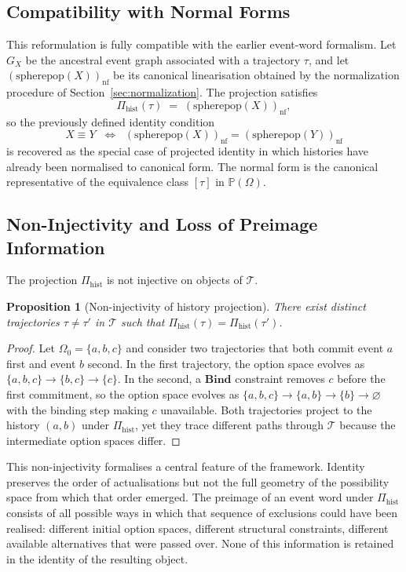 \documentclass[12pt]{article}
\theoremstyle{plain}
\newtheorem{proposition}[theorem]{Proposition}
\theoremstyle{definition}
\theoremstyle{remark}
\newcommand{\Bind}{\mathbf{Bind}}
\newcommand{\PathCat}{\mathbb{P}(\Omega)}
\begin{document}
\subsection{Compatibility with Normal Forms}

This reformulation is fully compatible with the earlier event-word formalism.
Let $G_X$ be the ancestral event graph associated with a trajectory $\tau$, and
let $(\mathrm{spherepop}(X))_{\mathrm{nf}}$ be its canonical linearisation
obtained by the normalization procedure of Section~\ref{sec:normalization}.
The projection satisfies
\[
  \Pi_{\mathrm{hist}}(\tau) \;=\; (\mathrm{spherepop}(X))_{\mathrm{nf}},
\]
so the previously defined identity condition
\[
  X \equiv Y
  \;\;\Longleftrightarrow\;\;
  (\mathrm{spherepop}(X))_{\mathrm{nf}} = (\mathrm{spherepop}(Y))_{\mathrm{nf}}
\]
is recovered as the special case of projected identity in which histories have
already been normalised to canonical form.  The normal form is the canonical
representative of the equivalence class $[\tau]$ in $\PathCat$.

\subsection{Non-Injectivity and Loss of Preimage Information}

The projection $\Pi_{\mathrm{hist}}$ is not injective on objects of
$\mathcal{T}$.

\begin{proposition}[Non-injectivity of history projection]
\label{prop:noninjectivity}
There exist distinct trajectories $\tau \neq \tau'$ in $\mathcal{T}$ such that
$\Pi_{\mathrm{hist}}(\tau) = \Pi_{\mathrm{hist}}(\tau')$.
\end{proposition}

\begin{proof}
Let $\Omega_0 = \{a, b, c\}$ and consider two trajectories that both commit
event $a$ first and event $b$ second.  In the first trajectory, the option space
evolves as $\{a,b,c\} \to \{b,c\} \to \{c\}$.  In the second, a $\Bind$
constraint removes $c$ before the first commitment, so the option space evolves
as $\{a,b,c\} \to \{a,b\} \to \{b\} \to \varnothing$ with the binding step
making $c$ unavailable.  Both trajectories project to the history $(a, b)$
under $\Pi_{\mathrm{hist}}$, yet they trace different paths through
$\mathcal{T}$ because the intermediate option spaces differ.
\end{proof}

This non-injectivity formalises a central feature of the framework.  Identity
preserves the order of actualisations but not the full geometry of the
possibility space from which that order emerged.  The preimage of an event word
under $\Pi_{\mathrm{hist}}$ consists of all possible ways in which that sequence
of exclusions could have been realised: different initial option spaces, different
structural constraints, different available alternatives that were passed over.
None of this information is retained in the identity of the resulting object.
\end{document}
